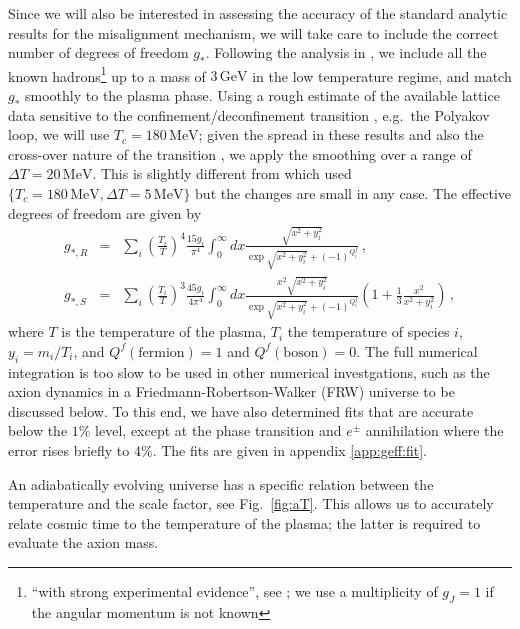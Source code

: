 \documentclass[preprint,nofootinbib]{revtex4}
\newcommand{\units}[1]{\, \mathrm{#1}}
\begin{document}
Since we will also be interested in assessing the accuracy of the standard analytic results for the misalignment mechanism, we will take care to include the correct number of degrees of freedom $g_*$. Following the analysis in \cite{coleman:roos:geff}, we include all the known hadrons\footnote{``with strong experimental evidence'', see \cite{amsler:2008:pdg}; we use a multiplicity of $g_J=1$ if the angular momentum is not known} up to a mass of $3 \units{GeV}$ in the low temperature regime, and match $g_*$ smoothly to the plasma phase. Using a rough estimate of the available lattice data sensitive to the confinement/deconfinement transition \cite{karsch:recent:partII}, e.g.\ the Polyakov loop, we will use $T_c=180\units{MeV}$; given the spread in these results and also the cross-over nature of the transition \cite{aoki:fodor:katz:szabo:transition:temperature}, we apply the smoothing over a range of $\Delta T=20\units{MeV}$. This is slightly different from \cite{coleman:roos:geff} which used $\{T_c=180\units{MeV},\Delta T=5 \units{MeV}\}$ but  the changes are small in any case. The effective degrees of freedom are given by \cite{turner:kolb:cosmology}
\begin{eqnarray}
 g_{*,R} &=&\sum_i \left(\frac{T_i}{T}\right)^4 \frac{15 g_i}{\pi^4} \int_0^\infty dx \frac{\sqrt{x^2+y_i^2}}{\exp\sqrt{x^2+y_i^2}+(-1)^{Q^f_i}}\,, \label{eq:geff:R}\\
 g_{*,S} &=&\sum_i \left(\frac{T_i}{T}\right)^3 \frac{45 g_i}{4 \pi^4} \int_0^\infty dx \frac{x^2 \sqrt{x^2+y_i^2}}{\exp\sqrt{x^2+y_i^2}+(-1)^{Q^f_i}}\left( 1+\frac{1}{3}\frac{x^2}{x^2+y^2_i} \right)\,, \label{eq:geff:S}
\end{eqnarray}
where $T$ is the temperature of the plasma, $T_i$ the temperature of species $i$, $y_i=m_i/T_i$, and $Q^f(\mathrm{fermion})=1$ and $Q^f(\mathrm{boson})=0$. The full numerical integration is too slow to be used in other numerical investgations, such as the axion dynamics in a Friedmann-Robertson-Walker (FRW) universe to be discussed below. To this end, we have also determined fits that are accurate below the $1\%$ level, except at the phase transition and $e^\pm$ annihilation where the error rises briefly to $4\%$. The fits are given in appendix \ref{app:geff:fit}.

An adiabatically evolving universe has a specific relation between the temperature and the scale factor, see Fig.~\ref{fig:aT}. This allows us to accurately relate cosmic time to the temperature of the plasma; the latter is required to evaluate the axion mass.
\end{document}
